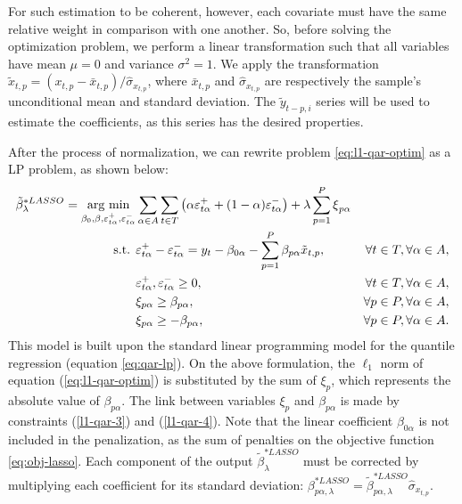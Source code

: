 For such estimation to be coherent, however, each covariate must have the same relative weight in comparison with one another. 
So, before solving the optimization problem, we perform a linear transformation such that all variables have mean $\mu = 0$ and variance $\sigma^2 = 1$. 
We apply the transformation $\tilde{x}_{t,p} = (x_{t,p} - \bar{x}_{t,p}) / \hat\sigma_{x_{t,p}}$, where $\bar{x}_{t,p}$ and $\hat{\sigma}_{x_{t,p}}$ are respectively the sample's unconditional mean and standard deviation. The $\tilde{y}_{t-p,i}$ series will be used to estimate the coefficients, as this series has the desired properties. 

After the process of normalization, we can rewrite problem \ref{eq:l1-qar-optim} as a LP problem, as shown below:
\begin{eqnarray}
\tilde \beta_\lambda^{*LASSO} = \underset{\beta_{0},\beta,\varepsilon_{t \alpha}^{+},\varepsilon_{t \alpha}^{-}}{\text{arg min}} & \sum_{\alpha \in A} \sum_{t \in T}\left(\alpha\varepsilon_{t \alpha}^{+}+(1-\alpha)\varepsilon_{t \alpha}^{-}\right)+\lambda\sum_{p=1}^{P}\mbox{\ensuremath{\xi}}_{p \alpha} \label{eq:obj-lasso} \\
\mbox{s.t. } & \varepsilon_{t \alpha}^{+}-\varepsilon_{t \alpha}^{-}= y_{t}-\beta_{0 \alpha}-\sum_{p=1}^{P}\beta_{p \alpha}\tilde x_{t,p},&\forall t\in T, \forall \alpha \in A, \\
& \varepsilon_{t \alpha}^{+},\varepsilon_{t \alpha}^{-}\geq0,&\forall t \in T, \forall \alpha \in A,\\
& \xi_{p\alpha}\geq\beta_{p \alpha},&\forall p\in P, \forall \alpha \in A,  \label{l1-qar-3}
\\
& \xi_{p\alpha}\geq-\beta_{p \alpha},&\forall p\in P, \forall \alpha \in A.  \label{l1-qar-4}
\end{eqnarray}
This model is built upon the standard linear programming model for the quantile regression (equation \ref{eq:qar-lp}). 
On the above formulation, the $\ell_1$ norm of equation (\ref{eq:l1-qar-optim}) is substituted by the sum of $\xi_p$, which represents the absolute value of $\beta_{p\alpha}$. The link between variables $\xi_p$ and $\beta_{p\alpha}$ is made by constraints (\ref{l1-qar-3}) and (\ref{l1-qar-4}). Note that the linear coefficient $\beta_{0\alpha}$ is not included in the penalization, as the sum of penalties on the objective function \ref{eq:obj-lasso}.
Each component of the output $\tilde \beta_\lambda^{*LASSO}$ must be corrected by multiplying each coefficient for its standard deviation: $\beta_{p\alpha,\lambda}^{*LASSO} = \tilde \beta_{p\alpha,\lambda}^{*LASSO} \hat\sigma_{x_{t,p}}$.

